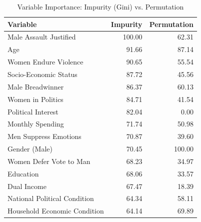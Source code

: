 \begin{table}[!h]
\centering
\caption{Variable Importance: Impurity (Gini) vs. Permutation}
\centering
\begin{tabular}[t]{lrr}
\toprule
Variable & Impurity & Permutation\\
\midrule
Male Assault Justified & 100.00 & 62.31\\
Age & 91.66 & 87.14\\
Women Endure Violence & 90.65 & 55.54\\
Socio-Economic Status & 87.72 & 45.56\\
Male Breadwinner & 86.37 & 60.13\\
Women in Politics & 84.71 & 41.54\\
Political Interest & 82.04 & 0.00\\
Monthly Spending & 71.74 & 50.98\\
Men Suppress Emotions & 70.87 & 39.60\\
Gender (Male) & 70.45 & 100.00\\
Women Defer Vote to Man & 68.23 & 34.97\\
Education & 68.06 & 33.57\\
Dual Income & 67.47 & 18.39\\
National Political Condition & 64.34 & 58.11\\
Household Economic Condition & 64.14 & 69.89\\
\bottomrule
\end{tabular}
\end{table}
